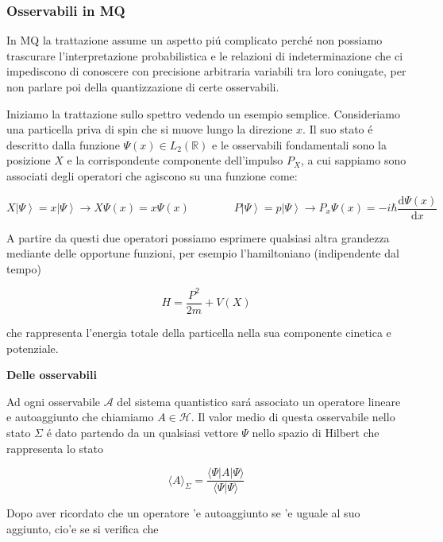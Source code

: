 \subsubsection{Osservabili in MQ}

In MQ la trattazione assume un aspetto pi\'u complicato perch\'e non possiamo trascurare l'interpretazione probabilistica e le relazioni di indeterminazione che ci impediscono di conoscere con precisione arbitraria variabili tra loro coniugate, per non parlare poi della quantizzazione di certe osservabili.

Iniziamo la trattazione sullo spettro vedendo un esempio semplice. Consideriamo una particella priva di spin che si muove lungo la direzione $x$. Il suo stato \'e descritto dalla funzione $\Psi(x) \in L_2(\mathbb{R})$ e le osservabili fondamentali sono la posizione $X$ e la corrispondente componente dell'impulso $P_X$, a cui sappiamo sono associati degli operatori che agiscono su una funzione come:

\begin{equation}
	\label{eq:oss in mq}
	X\left|\Psi\right\rangle=x\left|\Psi\right\rangle\longrightarrow X\Psi(x)=x\Psi(x)\qquad\qquad P\left|\Psi\right\rangle=p\left|\Psi\right\rangle\longrightarrow P_{x}\Psi(x)=-i\hbar\frac{\mathrm{d}\Psi(x)}{\mathrm{d}x}
\end{equation}

A partire da questi due operatori possiamo esprimere qualsiasi altra grandezza mediante delle opportune funzioni, per esempio l'hamiltoniano (indipendente dal tempo)

\begin{equation}
	H={\frac{P^{2}}{2m}}+V(X)
\end{equation}

che rappresenta l'energia totale della particella nella sua componente cinetica e potenziale.


\begin{postulato} \textbf{Delle osservabili}

Ad ogni osservabile $\mathcal{A}$ del sistema quantistico sar\'a associato un operatore lineare e autoaggiunto che chiamiamo $A \in \mathcal{H}$. Il valor medio di questa osservabile nello stato $\Sigma$ \'e dato partendo da un qualsiasi vettore $\Psi$ nello spazio di Hilbert che rappresenta lo stato

$$\langle A\rangle_{\Sigma}=\frac{\langle\Psi|A|\Psi\rangle}{\langle\Psi|\Psi\rangle}$$
\end{postulato}

Dopo aver ricordato che un operatore 'e autoaggiunto se 'e uguale al suo aggiunto, cio'e se si verifica che

